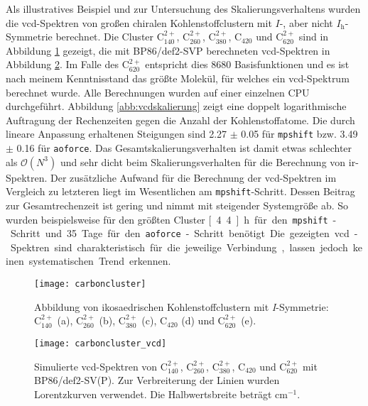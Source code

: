 Als illustratives Beispiel und zur Untersuchung des Skalierungsverhaltens wurden die \ac{vcd}-Spektren von großen chiralen Kohlenstoffclustern mit $I$-, aber nicht $I_\textrm{h}$-Symmetrie berechnet. Die Cluster C$^{2+}_{140}$, C$^{2+}_{260}$, C$^{2+}_{380}$, C$_{420}$ und C$^{2+}_{620}$ sind in Abbildung \ref{abb:carboncluster} gezeigt, die mit BP86/def2-SVP berechneten \ac{vcd}-Spektren in Abbildung \ref{abb:carboncluster_vcd}. Im Falle des C$^{2+}_{620}$ entspricht dies 8680 Basisfunktionen und es ist nach meinem Kenntnisstand das größte Molekül, für welches ein \ac{vcd}-Spektrum berechnet wurde. Alle Berechnungen wurden auf einer einzelnen CPU durchgeführt. Abbildung \ref{abb:vcdskalierung} zeigt eine doppelt logarithmische Auftragung der Rechenzeiten gegen die Anzahl der Kohlenstoffatome. Die durch lineare Anpassung erhaltenen Steigungen sind 2.27 $\pm$ 0.05 für \texttt{mpshift} bzw. 3.49 $\pm$ 0.16 für \texttt{aoforce}. Das Gesamtskalierungsverhalten ist damit etwas schlechter als $\mathcal{O}(N^3)$ und sehr dicht beim Skalierungsverhalten für die Berechnung von \ac{ir}-Spektren. Der zusätzliche Aufwand für die Berechnung der \ac{vcd}-Spektren im Vergleich zu letzteren liegt im Wesentlichen am \texttt{mpshift}-Schritt. Dessen Beitrag zur Gesamtrechenzeit ist gering und nimmt mit steigender Systemgröße ab. So wurden beispielsweise für den größten Cluster \unit[4.4]{h} für den \texttt{mpshift}-Schritt und 35 Tage für den \texttt{aoforce}-Schritt benötigt. Die gezeigten \ac{vcd}-Spektren sind charakteristisch für die jeweilige Verbindung, lassen jedoch keinen systematischen Trend erkennen.
\begin{figure}[ht!]
	\centering
	\texttt{[image: carboncluster]}
	\captionsetup{figurewithin = chapter}
	\captionsetup{font=small, labelfont=bf}\caption[Abbildung von ikosaedrischen Kohlenstoffclustern]{Abbildung von ikosaedrischen Kohlenstoffclustern mit \textit{I}-Symmetrie: C$^{2+}_{140}$ \textsf{(a)}, C$^{2+}_{260}$ \textsf{(b)}, C$^{2+}_{380}$ \textsf{(c)}, C$_{420}$ \textsf{(d)} und C$^{2+}_{620}$ \textsf{(e)}.}
\label{abb:carboncluster}
\end{figure}

\begin{figure}[ht!]
	\centering
	\texttt{[image: carboncluster\_vcd]}
	\captionsetup{figurewithin = chapter}
	\captionsetup{font=small, labelfont=bf}\caption[Simulierte \ac{vcd}-Spektren von ikosaedrischen Kohlenstoffclustern]{Simulierte \ac{vcd}-Spektren von C$^{2+}_{140}$, C$^{2+}_{260}$, C$^{2+}_{380}$, C$_{420}$ und C$^{2+}_{620}$ mit BP86/def2-SV(P). Zur Verbreiterung der Linien wurden Lorentzkurven verwendet. Die Halbwertsbreite beträgt \unit[4]{cm$^{-1}$}.}
\label{abb:carboncluster_vcd}
\end{figure}

